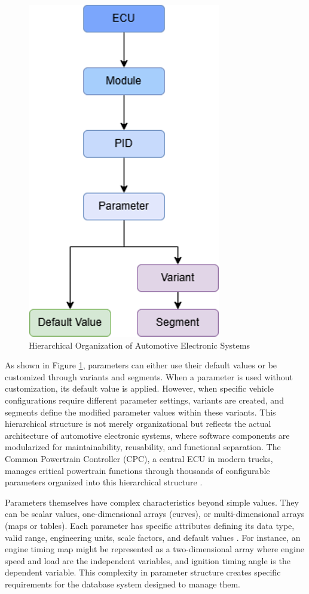 \begin{figure}[ht]
    \centering
    \includegraphics[height=0.4\textheight]{figures/ecu_hierarchy.png}
    \caption{Hierarchical Organization of Automotive Electronic Systems}
    \label{fig:ecu-hierarchy}
\end{figure}

As shown in Figure \ref{fig:ecu-hierarchy}, parameters can either use their default values or be customized through variants and segments. When a parameter is used without customization, its default value is applied. However, when specific vehicle configurations require different parameter settings, variants are created, and segments define the modified parameter values within these variants. This hierarchical structure is not merely organizational but reflects the actual architecture of automotive electronic systems, where software components are modularized for maintainability, reusability, and functional separation. The Common Powertrain Controller (\ac{CPC}), a central \ac{ECU} in modern trucks, manages critical powertrain functions through thousands of configurable parameters organized into this hierarchical structure \cite{staron2021automotive}.

Parameters themselves have complex characteristics beyond simple values. They can be scalar values, one-dimensional arrays (curves), or multi-dimensional arrays (maps or tables). Each parameter has specific attributes defining its data type, valid range, engineering units, scale factors, and default values \cite{pretschner2007software}. For instance, an engine timing map might be represented as a two-dimensional array where engine speed and load are the independent variables, and ignition timing angle is the dependent variable. This complexity in parameter structure creates specific requirements for the database system designed to manage them.

